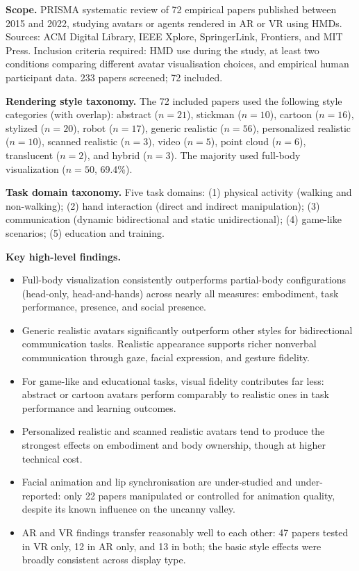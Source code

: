 \documentclass[11pt, a4paper]{article}
\begin{document}
\textbf{Scope.} PRISMA systematic review of 72 empirical papers published between 2015 and 2022, studying avatars or agents rendered in AR or VR using HMDs. Sources: ACM Digital Library, IEEE Xplore, SpringerLink, Frontiers, and MIT Press. Inclusion criteria required: HMD use during the study, at least two conditions comparing different avatar visualisation choices, and empirical human participant data. 233 papers screened; 72 included.

\textbf{Rendering style taxonomy.} The 72 included papers used the following style categories (with overlap): abstract ($n = 21$), stickman ($n = 10$), cartoon ($n = 16$), stylized ($n = 20$), robot ($n = 17$), generic realistic ($n = 56$), personalized realistic ($n = 10$), scanned realistic ($n = 3$), video ($n = 5$), point cloud ($n = 6$), translucent ($n = 2$), and hybrid ($n = 3$). The majority used full-body visualization ($n = 50$, 69.4\%).

\textbf{Task domain taxonomy.} Five task domains: (1) physical activity (walking and non-walking); (2) hand interaction (direct and indirect manipulation); (3) communication (dynamic bidirectional and static unidirectional); (4) game-like scenarios; (5) education and training.

\textbf{Key high-level findings.}
\begin{itemize}[leftmargin=2em]
  \item Full-body visualization consistently outperforms partial-body configurations (head-only, head-and-hands) across nearly all measures: embodiment, task performance, presence, and social presence.
  \item Generic realistic avatars significantly outperform other styles for bidirectional communication tasks. Realistic appearance supports richer nonverbal communication through gaze, facial expression, and gesture fidelity.
  \item For game-like and educational tasks, visual fidelity contributes far less: abstract or cartoon avatars perform comparably to realistic ones in task performance and learning outcomes.
  \item Personalized realistic and scanned realistic avatars tend to produce the strongest effects on embodiment and body ownership, though at higher technical cost.
  \item Facial animation and lip synchronisation are under-studied and under-reported: only 22 papers manipulated or controlled for animation quality, despite its known influence on the uncanny valley.
  \item AR and VR findings transfer reasonably well to each other: 47 papers tested in VR only, 12 in AR only, and 13 in both; the basic style effects were broadly consistent across display type.
\end{itemize}
\end{document}
